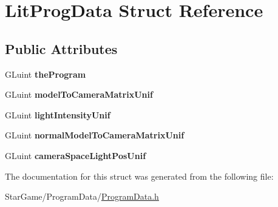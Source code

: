 \hypertarget{struct_lit_prog_data}{\section{Lit\-Prog\-Data Struct Reference}
\label{struct_lit_prog_data}
}
\subsection*{Public Attributes}
\begin{DoxyCompactItemize}
\item 
\hypertarget{struct_lit_prog_data_a50e45901aa3f961436f12c02ae80709c}{G\-Luint {\bfseries the\-Program}}\label{struct_lit_prog_data_a50e45901aa3f961436f12c02ae80709c}

\item 
\hypertarget{struct_lit_prog_data_a9773d4682a57ff484b7642d78437b537}{G\-Luint {\bfseries model\-To\-Camera\-Matrix\-Unif}}\label{struct_lit_prog_data_a9773d4682a57ff484b7642d78437b537}

\item 
\hypertarget{struct_lit_prog_data_a2238f8cc39c5e8f0810241f2b4db7117}{G\-Luint {\bfseries light\-Intensity\-Unif}}\label{struct_lit_prog_data_a2238f8cc39c5e8f0810241f2b4db7117}

\item 
\hypertarget{struct_lit_prog_data_a4c28703d5d72139c3d9f69a9d3b46b47}{G\-Luint {\bfseries normal\-Model\-To\-Camera\-Matrix\-Unif}}\label{struct_lit_prog_data_a4c28703d5d72139c3d9f69a9d3b46b47}

\item 
\hypertarget{struct_lit_prog_data_ab7c502fcd0068b43e51b9d1f14192c74}{G\-Luint {\bfseries camera\-Space\-Light\-Pos\-Unif}}\label{struct_lit_prog_data_ab7c502fcd0068b43e51b9d1f14192c74}

\end{DoxyCompactItemize}


The documentation for this struct was generated from the following file\-:\begin{DoxyCompactItemize}
\item 
Star\-Game/\-Program\-Data/\hyperlink{_program_data_8h}{Program\-Data.\-h}\end{DoxyCompactItemize}
